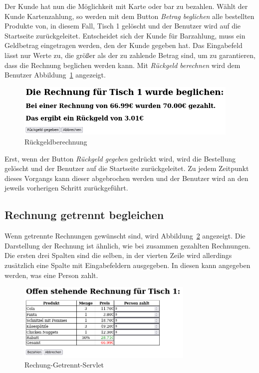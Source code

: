 Der Kunde hat nun die Möglichkeit mit Karte oder bar zu bezahlen.
Wählt der Kunde Kartenzahlung, so werden mit dem Button \textit{Betrag beglichen} alle bestellten Produkte von, in diesem Fall, Tisch 1 gelöscht und der Benutzer wird auf die Startseite zurückgeleitet.
Entscheidet sich der Kunde für Barzahlung, muss ein Geldbetrag eingetragen werden, den der Kunde gegeben hat.
Das Eingabefeld lässt nur Werte zu, die größer als der zu zahlende Betrag sind, um zu garantieren, dass die Rechnung beglichen werden kann.
Mit \textit{Rückgeld berechnen} wird dem Benutzer Abbildung~\ref{abb:BarZusammen} angezeigt.

\begin{figure}[htb]
  \centering
  \includegraphics[width=0.95\textwidth]{images/RechnungZusammenBarServlet.png}
  \caption[Rückgeldberechnung]{Rückgeldberechnung}
  \label{abb:BarZusammen}
\end{figure}

Erst, wenn der Button \textit{Rückgeld gegeben} gedrückt wird, wird die Bestellung gelöscht und der Benutzer auf die Startseite zurückgeleitet.
Zu jedem Zeitpunkt dieses Vorgangs kann dieser abgebrochen werden und der Benutzer wird an den jeweils vorherigen Schritt zurückgeführt.


\subsection{Rechnung getrennt begleichen} %
\label{sub:Rechnung getrennt begleichen}

Wenn getrennte Rechnungen gewünscht sind, wird Abbildung~\ref{abb:RechnungGetrennt} angezeigt.
Die Darstellung der Rechnung ist ähnlich, wie bei zusammen gezahlten Rechnungen.
Die ersten drei Spalten sind die selben, in der vierten Zeile wird allerdings zusätzlich eine Spalte mit Eingabefeldern ausgegeben.
In diesen kann angegeben werden, was eine Person zahlt.

\begin{figure}[htb]
  \centering
  \includegraphics[width=0.75\textwidth]{images/RechnungGetrenntServlet.png}
  \caption[Rechung-Getrennt-Servlet]{Rechung-Getrennt-Servlet}
  \label{abb:RechnungGetrennt}
\end{figure}

